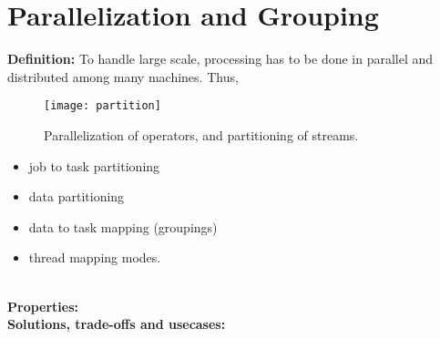 \section{Parallelization and Grouping}
\label{sec:parallelization}


\noindent\textbf{Definition:} To handle large scale, processing has to be done in parallel and distributed among many machines. Thus, 


\begin{figure}[h]
	\centering
	\texttt{[image: partition]}
	\caption{Parallelization of operators, and partitioning of streams.}
	\label{fig:grouping}
\end{figure}



\begin{itemize}
	\item job to task partitioning
	\item data partitioning
	\item data to task mapping (groupings)
	\item thread mapping modes.
	
\end{itemize}

\noindent \textbf{\\Properties:}
\noindent \textbf{\\Solutions, trade-offs and usecases:}

